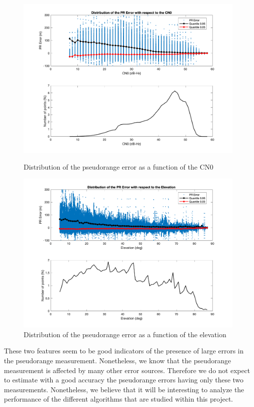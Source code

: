 \documentclass[a4paper, report, oneside, UKenglish]{memoir}
\begin{document}
\begin{figure}[hb]
  \centering
  \begin{minipage}[b]{0.49\textwidth}
    \includegraphics[width=\textwidth]{data-analysis/pre_cn0.png}
    \caption{Distribution of the pseudorange error as a function of the CN0}
    \label{fig:pre_cn0}
  \end{minipage}
  \hfill
  \begin{minipage}[b]{0.49\textwidth}
    \includegraphics[width=\textwidth]{data-analysis/pre_elev.png}
    \caption{Distribution of the pseudorange error as a function of the elevation}
    \label{fig:pre_elev}
  \end{minipage}
\end{figure}

These two features seem to be good indicators of the presence of large errors in the pseudorange measurement. Nonetheless, we know that the pseudorange measurement is affected by many other error sources. Therefore we do not expect to estimate with a good accuracy the pseudorange errors having only these two measurements. Nonetheless, we believe that it will be interesting to analyze the performance of the different algorithms that are studied within this project.
\end{document}
